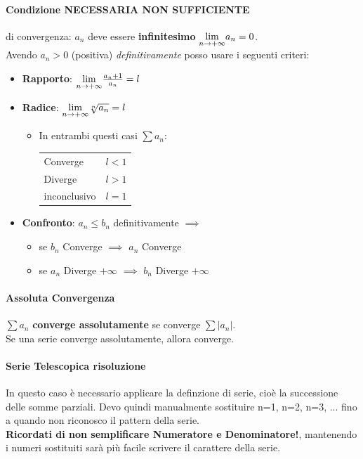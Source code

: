 \documentclass[12pt, a4paper]{article}
\begin{document}
\paragraph*{Condizione NECESSARIA NON SUFFICIENTE} di convergenza: $a_n$ deve essere \textbf{infinitesimo} $\underset{n \to +\infty}{\lim} a_n = 0$.
\\Avendo $a_n>0$ (positiva) \emph{definitivamente} posso usare i seguenti criteri:
\begin{itemize}
	\item \textbf{Rapporto}: $\underset{n \to +\infty}{\lim} \frac{a_n+1}{a_n} = l$
	\item \textbf{Radice}: $\underset{n \to +\infty}{\lim} \sqrt[n]{a_n} = l$
	\begin{itemize}
	\item 	In entrambi questi casi $\sum a_n$:\\
		\begin{tabular}{ l|c }
			Converge    & $ l<1 $                                \\
			Diverge       &  $ l>1 $                           \\
			inconclusivo & $ l=1 $ \\
		\end{tabular}
	\end{itemize}
	\item \textbf{Confronto}: $a_n\leq b_n$ definitivamente $\implies$
	      \begin{itemize}
		      \item se $b_n$ Converge $\implies$  $a_n$ Converge
		      \item se $a_n$ Diverge $+\infty$ $\implies$ $b_n$ Diverge $+\infty$
	      \end{itemize}
\end{itemize}

\paragraph*{Assoluta Convergenza}
$\sum a_n$ \textbf{converge assolutamente} se converge $\sum |a_n|$.\\
Se una serie converge assolutamente, allora converge.

\paragraph*{Serie Telescopica risoluzione}
In questo caso è necessario applicare la definzione di serie, cioè la successione delle somme 
parziali. Devo quindi manualmente sostituire n=1, n=2, n=3, ...
fino a quando non riconosco il pattern della serie.
\\ \textbf{Ricordati di non semplificare Numeratore e Denominatore!},
mantenendo i numeri sostituiti sarà più facile scrivere il carattere della serie.
\end{document}
